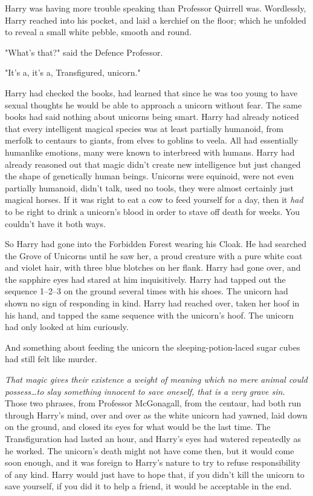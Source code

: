 Harry was having more trouble speaking than Professor Quirrell was. Wordlessly,
Harry reached into his pocket, and laid a kerchief on the floor; which he
unfolded to reveal a small white pebble, smooth and round.

"What's that?" said the Defence Professor.

"It's a, it's a, Transfigured, unicorn."

Harry had checked the books, had learned that since he was too young to have
sexual thoughts he would be able to approach a unicorn without fear. The same
books had said nothing about unicorns being smart. Harry had already noticed
that every intelligent magical species was at least partially humanoid, from
merfolk to centaurs to giants, from elves to goblins to veela. All had
essentially humanlike emotions, many were known to interbreed with humans.
Harry had already reasoned out that magic didn't create new intelligence but
just changed the shape of genetically human beings. Unicorns were equinoid,
were not even partially humanoid, didn't talk, used no tools, they were almost
certainly just magical horses. If it was right to eat a cow to feed yourself
for a day, then it \emph{had} to be right to drink a unicorn's blood in order
to stave off death for weeks. You couldn't have it both ways.

So Harry had gone into the Forbidden Forest wearing his Cloak. He had searched
the Grove of Unicorns until he saw her, a proud creature with a pure white coat
and violet hair, with three blue blotches on her flank. Harry had gone over,
and the sapphire eyes had stared at him inquisitively. Harry had tapped out the
sequence 1–2–3 on the ground several times with his shoes. The unicorn had
shown no sign of responding in kind. Harry had reached over, taken her hoof in
his hand, and tapped the same sequence with the unicorn's hoof. The unicorn had
only looked at him curiously.

And something about feeding the unicorn the sleeping-potion-laced sugar cubes
had still felt like murder.

\emph{That magic gives their existence a weight of meaning which no mere animal
could possess…to slay something innocent to save oneself, that is a
very grave sin.} Those two phrases, from Professor McGonagall, from the
centaur, had both run through Harry's mind, over and over as the white unicorn
had yawned, laid down on the ground, and closed its eyes for what would be the
last time. The Transfiguration had lasted an hour, and Harry's eyes had watered
repeatedly as he worked. The unicorn's death might not have come then, but it
would come soon enough, and it was foreign to Harry's nature to try to refuse
responsibility of any kind. Harry would just have to hope that, if you didn't
kill the unicorn to save yourself, if you did it to help a friend, it would be
acceptable in the end.

